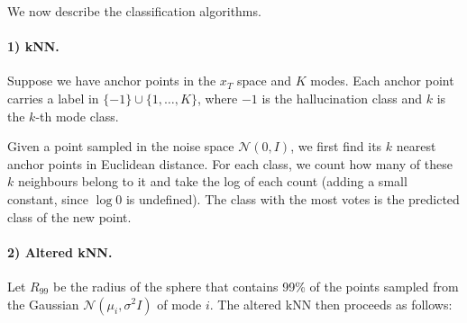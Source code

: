 We now describe the classification algorithms.

\paragraph{1) kNN.}
Suppose we have anchor points in the $x_T$ space and $K$ modes. Each anchor point carries a
label in $\{-1\} \cup \{1, \dots, K\}$, where $-1$ is the hallucination class and $k$ is the
$k$-th mode class.

Given a point sampled in the noise space $\mathcal{N}(0, I)$, we first find its $k$ nearest
anchor points in Euclidean distance. For each class, we count how many of these $k$ neighbours
belong to it and take the log of each count (adding a small constant, since $\log 0$ is
undefined). The class with the most votes is the predicted class of the new point.

\paragraph{2) Altered kNN.}
Let $R_{99}$ be the radius of the sphere that contains 99\% of the points sampled from the
Gaussian $\mathcal{N}(\mu_i, \sigma^2 I)$ of mode $i$. The altered kNN then proceeds as follows:

